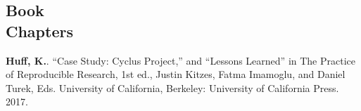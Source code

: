 \documentclass[margin,line]{resume}
\begin{document}
\begin{resume}
    \section{\mysidestyle Book\\Chapters}
      \begin{bibenum} 
      \item \textbf{Huff, K.}. ``Case Study: Cyclus Project,'' and ``Lessons 
              Learned'' in The Practice 
              of Reproducible Research, 1st ed., Justin Kitzes, Fatma Imamoglu, 
              and Daniel Turek, Eds. University of California, Berkeley: 
              University of California Press. 2017.
      \end{bibenum}

\end{resume}
\end{document}
